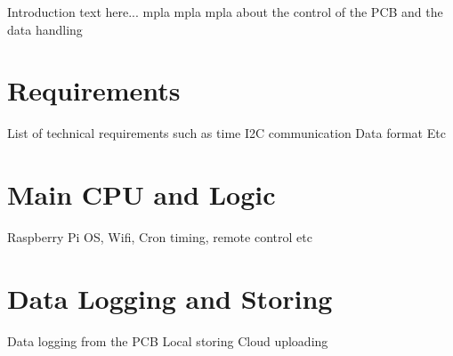 Introduction text here...
mpla mpla mpla about the control of the PCB and the data handling

\section{Requirements}
List of technical requirements such as
time
I2C communication
Data format
Etc

\section{Main CPU and Logic}
Raspberry Pi
OS, Wifi, Cron timing, remote control etc

\section{Data Logging and Storing}
Data logging from the PCB
Local storing
Cloud uploading

